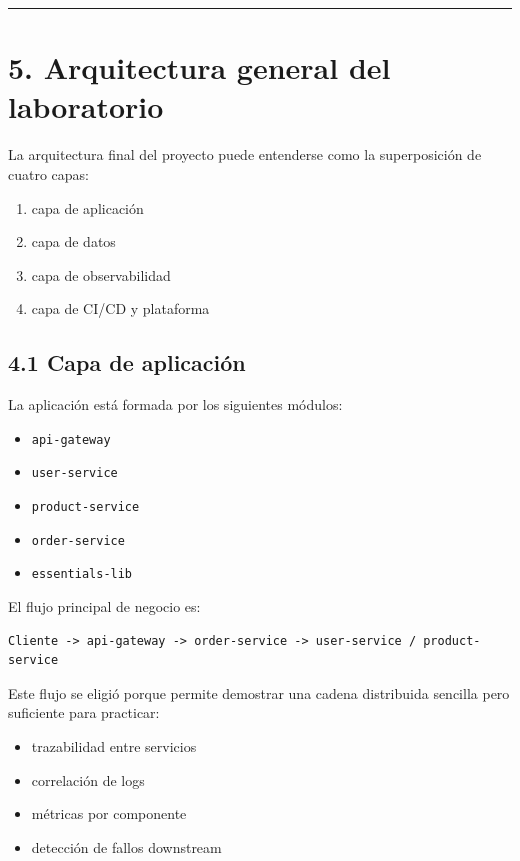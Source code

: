 \documentclass[
a4paper,
12pt]{report}
\providecommand{\tightlist}{%
  \setlength{\itemsep}{0pt}\setlength{\parskip}{0pt}}
\begin{document}
\begin{center}\rule{0.5\linewidth}{0.5pt}\end{center}

\chapter{5. Arquitectura general del
laboratorio}\label{arquitectura-general-del-laboratorio}

La arquitectura final del proyecto puede entenderse como la
superposición de cuatro capas:

\begin{enumerate}
\def\labelenumi{\arabic{enumi}.}
\tightlist
\item
  capa de aplicación\\
\item
  capa de datos\\
\item
  capa de observabilidad\\
\item
  capa de CI/CD y plataforma
\end{enumerate}

\section{4.1 Capa de aplicación}\label{capa-de-aplicaciuxf3n}

La aplicación está formada por los siguientes módulos:

\begin{itemize}
\tightlist
\item
  \texttt{api-gateway}
\item
  \texttt{user-service}
\item
  \texttt{product-service}
\item
  \texttt{order-service}
\item
  \texttt{essentials-lib}
\end{itemize}

El flujo principal de negocio es:

\begin{verbatim}
Cliente -> api-gateway -> order-service -> user-service / product-service
\end{verbatim}

Este flujo se eligió porque permite demostrar una cadena distribuida
sencilla pero suficiente para practicar:

\begin{itemize}
\tightlist
\item
  trazabilidad entre servicios
\item
  correlación de logs
\item
  métricas por componente
\item
  detección de fallos downstream
\end{itemize}
\end{document}
